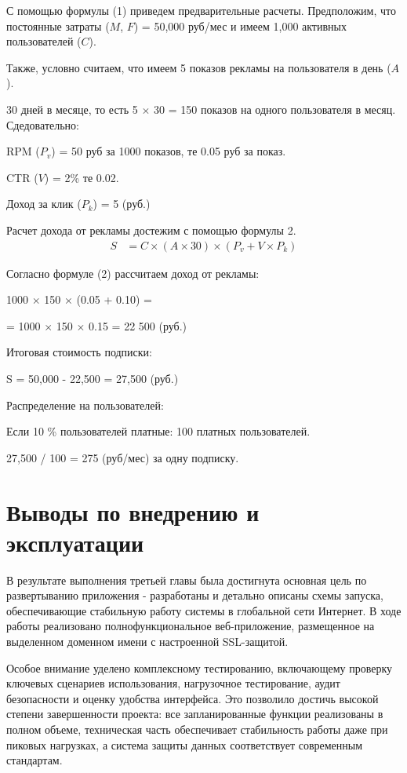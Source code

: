 \documentclass[a4paper,14pt,oneside]{extreport}
\begin{document}
С помощью формулы (1) приведем предварительные расчеты. Предположим, что постоянные затраты (\(M\), \(F\)) = 50,000 руб/мес и имеем 1,000 активных пользователей (\(C\)).

Также, условно считаем, что имеем 5 показов рекламы на пользователя в день (\(A\)).

30 дней в месяце, то есть 5 \(\times\) 30 = 150 показов на одного пользователя в месяц. Сдедовательно:

RPM (\(P_v\)) = 50 руб за 1000 показов, те 0.05 руб за показ.

CTR (\(V\)) = 2\% те 0.02.

Доход за клик (\(P_k\)) = 5 (руб.)

Расчет дохода от рекламы достежим с помощью формулы 2.
{\setlength{\abovedisplayskip}{0pt} %
 \setlength{\belowdisplayskip}{0pt} %
\begin{align}
S &= C \times (A \times 30) \times (P_v + V \times P_k) 
\end{align}
}

Согласно формуле (2) рассчитаем доход от рекламы:

1000 \(\times\) 150 \(\times\) (0.05 + 0.10) = 

= 1000 \(\times\) 150 \(\times\) 0.15 = 22 500  (руб.)

Итоговая стоимость подписки:

S = 50,000 - 22,500 = 27,500 (руб.)

Распределение на пользователей:

Если 10 \% пользователей платные: 100 платных пользователей.

27,500 / 100 = 275 (руб/мес) за одну подписку.



\section {Выводы по внедрению и эксплуатации}

В результате выполнения третьей главы была достигнута основная цель по развертыванию приложения - разработаны и детально описаны схемы запуска, обеспечивающие стабильную работу системы в глобальной сети Интернет. В ходе работы реализовано полнофункциональное веб-приложение, размещенное на выделенном доменном имени с настроенной SSL-защитой.

Особое внимание уделено комплексному тестированию, включающему проверку ключевых сценариев использования, нагрузочное тестирование, аудит безопасности и оценку удобства интерфейса. Это позволило достичь высокой степени завершенности проекта: все запланированные функции реализованы в полном объеме, техническая часть обеспечивает стабильность работы даже при пиковых нагрузках, а система защиты данных соответствует современным стандартам.
\end{document}
